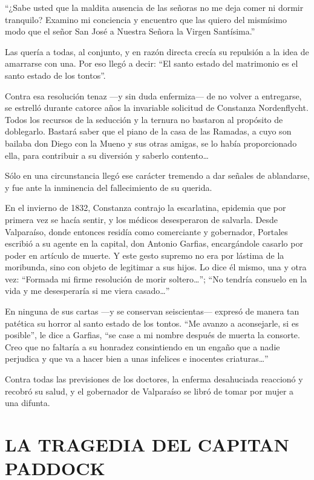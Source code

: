 \documentclass[10pt,twoside,openright]{memoir}
\begin{document}
``¿Sabe usted que la maldita ausencia de las señoras no me deja comer ni
dormir tranquilo? Examino mi conciencia y encuentro que las quiero del
mismísimo modo que el señor San José a Nuestra Señora la Virgen
Santísima.''

Las quería a todas, al conjunto, y en razón directa crecía su repulsión
a la idea de amarrarse con una. Por eso llegó a decir: ``El santo estado
del matrimonio es el santo estado de los tontos''.

Contra esa resolución tenaz ---y sin duda enfermiza--- de no volver a
entregarse, se estrelló durante catorce años la invariable solicitud de
Constanza Nordenflycht. Todos los recursos de la seducción y la ternura
no bastaron al propósito de doblegarlo. Bastará saber que el piano de la
casa de las Ramadas, a cuyo son bailaba don Diego con la Mueno y sus
otras amigas, se lo había proporcionado ella, para contribuir a su
diversión y saberlo contento\ldots

Sólo en una circunstancia llegó ese carácter tremendo a dar señales de
ablandarse, y fue ante la inminencia del fallecimiento de su querida.

En el invierno de 1832, Constanza contrajo la escarlatina, epidemia que
por primera vez se hacía sentir, y los médicos desesperaron de salvarla.
Desde Valparaíso, donde entonces residía como comerciante y gobernador,
Portales escribió a su agente en la capital, don Antonio Garfias,
encargándole casarlo por poder en artículo de muerte. Y este gesto
supremo no era por lástima de la moribunda, sino con objeto de legitimar
a sus hijos. Lo dice él mismo, una y otra vez: ``Formada mi firme
resolución de morir soltero\ldots ''; ``No tendría consuelo en la vida y me
desesperaría si me viera casado\ldots''

En ninguna de sus cartas ---y se conservan seiscientas--- expresó de
manera tan patética su horror al santo estado de los tontos. ``Me avanzo
a aconsejarle, si es posible'', le dice a Garfias, ``se case a mi
nombre después de muerta la
consorte. Creo que no faltaría a su honradez consintiendo en un engaño
que a nadie perjudica y que va a
hacer bien a unas infelices e inocentes criaturas\ldots''

Contra todas las previsiones de los doctores, la enferma desahuciada reaccionó y
recobró su salud, y el gobernador de Valparaíso se libró de tomar por
mujer a una difunta.

\chapter{LA TRAGEDIA DEL CAPITAN PADDOCK}
\end{document}
